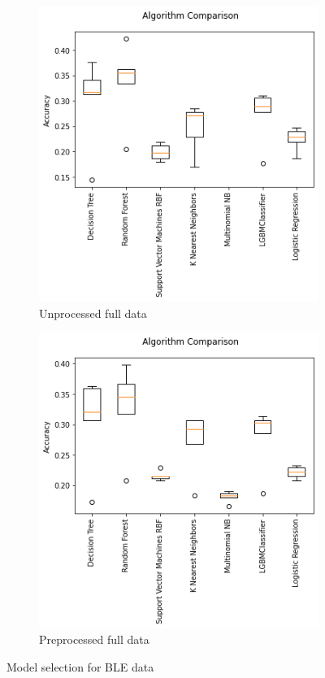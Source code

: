 \documentclass[a4paper,singleside,12pt]{report} %
\begin{document}
			\begin{figure}[!htb]
			  \centering
			  \begin{subfigure}[b]{0.48\linewidth}
			    \includegraphics[width=\linewidth]{./figures/results_model_comparison_unprocessed_full_data_ble.png}
			     \caption{Unprocessed full data}
			  \end{subfigure}
			  \begin{subfigure}[b]{0.48\linewidth}
			    \includegraphics[width=\linewidth]{./figures/results_model_comparison_preprocessed_full_data_ble.png}
			    \caption{Preprocessed full data}
			  \end{subfigure}
			  \caption{Model selection for BLE data}
			  \label{fig5.5}
			\end{figure} 
			
\end{document}
